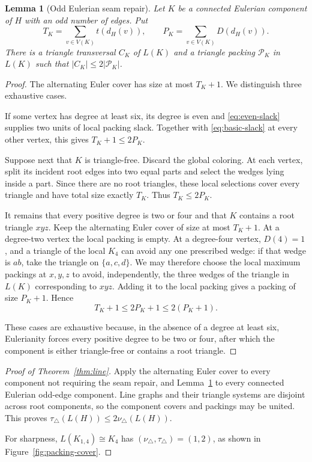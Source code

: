 \documentclass[11pt]{article}
\newtheorem{lemma}[theorem]{Lemma}
\theoremstyle{remark}
\newcommand{\tri}{\triangle}
\begin{document}
\begin{lemma}[Odd Eulerian seam repair]\label{lem:seam}
Let $K$ be a connected Eulerian component of $H$ with an odd number of edges.
Put
\[
  T_K=\sum_{v\in V(K)}t(d_H(v)),\qquad
  P_K=\sum_{v\in V(K)}D(d_H(v)).
\]
There is a triangle transversal $C_K$ of $L(K)$ and a triangle packing
$\mathcal P_K$ in $L(K)$ such that $|C_K|\leq 2|\mathcal P_K|$.
\end{lemma}

\begin{proof}
The alternating Euler cover has size at most $T_K+1$.  We distinguish three
exhaustive cases.

If some vertex has degree at least six, its degree is even and
\eqref{eq:even-slack} supplies two units of local packing slack.  Together
with \eqref{eq:basic-slack} at every other vertex, this gives
$T_K+1\leq 2P_K$.

Suppose next that $K$ is triangle-free.  Discard the global coloring.  At
each vertex, split its incident root edges into two equal parts and select the
wedges lying inside a part.  Since there are no root triangles, these
local selections cover every triangle and have total size exactly $T_K$.
Thus $T_K\leq 2P_K$.

It remains that every positive degree is two or four and that $K$ contains a
root triangle $xyz$.  Keep the alternating Euler cover of size at most
$T_K+1$.  At a degree-two vertex the local packing is empty.  At a
degree-four vertex, $D(4)=1$, and a triangle of the local $K_4$ can avoid any
one prescribed wedge: if that wedge is $ab$, take the triangle on
$\{a,c,d\}$.  We may therefore choose the local maximum packings at
$x,y,z$ to avoid, independently, the three wedges of the triangle in $L(K)$
corresponding to $xyz$.  Adding it to the local packing gives a packing of size
$P_K+1$.  Hence
\[
  T_K+1\leq 2P_K+1\leq 2(P_K+1).
\]

These cases are exhaustive because, in the absence of a degree at least six,
Eulerianity forces every positive degree to be two or four, after which the
component is either triangle-free or contains a root triangle.
\end{proof}

\begin{proof}[Proof of Theorem~\ref{thm:line}]
Apply the alternating Euler cover to every component not requiring the seam
repair, and Lemma~\ref{lem:seam} to every connected Eulerian odd-edge
component.  Line graphs and their triangle systems are disjoint across root
components, so the component covers and packings may be united.  This proves
$\tau_\tri(L(H))\leq2\nu_\tri(L(H))$.

For sharpness, $L(K_{1,4})\cong K_4$ has
$(\nu_\tri,\tau_\tri)=(1,2)$, as shown in Figure~\ref{fig:packing-cover}.
\end{proof}
\end{document}
